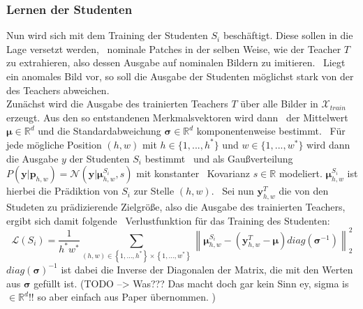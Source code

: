 \subsubsection*{Lernen der Studenten}
Nun wird sich mit dem Training der Studenten $S_{i}$ beschäftigt. Diese sollen in die Lage versetzt werden, \
nominale Patches in der selben Weise, wie der Teacher $T$ zu extrahieren, also dessen Ausgabe auf nominalen Bildern zu imitieren. \
Liegt ein anomales Bild vor, so soll die Ausgabe der Studenten möglichst stark von der des Teachers abweichen. \\
Zunächst wird die Ausgabe des trainierten Teachers $T$ über alle Bilder in $\mathcal{X}_{train}$ erzeugt. Aus den so entstandenen Merkmalsvektoren wird dann \
der Mittelwert $\boldsymbol{\mu}\in\mathbb{R}^{d}$ und die Standardabweichung $\mathbf{\sigma}\in\mathbb{R}^{d}$ komponentenweise bestimmt. \
Für jede mögliche Position $(h,w)$ mit $h\in\{1,...,h^{*}\}$ und $w\in\{1,...,w^{*}\}$ wird dann die Ausgabe $y$ der Studenten $S_{i}$ bestimmt \
und als Gaußverteilung $P\left(\mathbf{y}|\mathbf{p}_{h,w}\right)=\mathcal{N}\left(\mathbf{y}|\boldsymbol{\mu}^{S_{i}}_{h,w},s\right)$ mit konstanter \ 
Kovarianz $s\in\mathbb{R}$ modeliert. $\boldsymbol{\mu}^{S_{i}}_{h,w}$ ist hierbei die Prädiktion von $S_{i}$ zur Stelle $\left(h,w\right)$. \
Sei nun $\mathbf{y}^{T}_{h,w}$ die von den Studeten zu prädizierende Zielgröße, also die Ausgabe des trainierten Teachers, ergibt sich damit folgende \
Verlustfunktion für das Training des Studenten: \\
$$
\mathcal{L}\left(S_{i}\right)= \frac{1}{h^{*}w^{*}} \sum_{\left(h,w\right)\in \left\{1,...,h^{*}\right\} \times \left\{1,...,w^{*}\right\}} \left\lVert \boldsymbol{\mu}^{S_{i}}_{h,w} - \left(\mathbf{y}_{h,w}^{T}-\boldsymbol{\mu}\right)diag\left(\boldsymbol{\sigma}^{-1}\right) \right\rVert_{2}^{2}
$$
$diag\left(\boldsymbol{\sigma}\right)^{-1}$ ist dabei die Inverse der Diagonalen der Matrix, die mit den Werten aus $\boldsymbol{\sigma}$ gefüllt ist. (TODO --> Was??? Das macht doch gar kein Sinn ey, sigma is $\in \mathbb{R}^{d}$!! so aber einfach aus Paper übernommen. )
